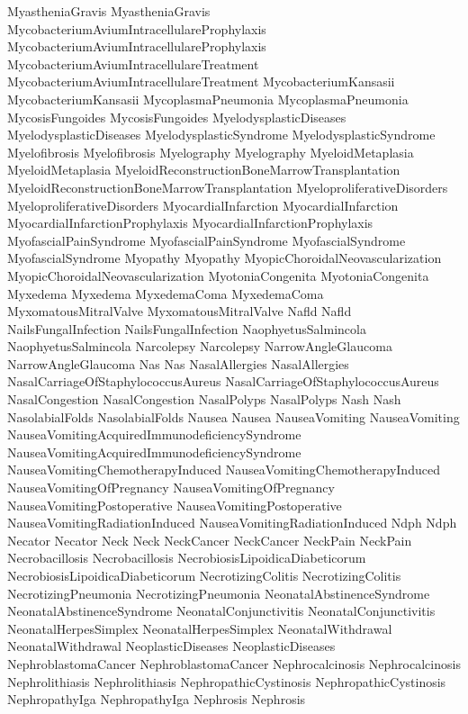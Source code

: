  MyastheniaGravis
 MyastheniaGravis
 MycobacteriumAviumIntracellulareProphylaxis
 MycobacteriumAviumIntracellulareProphylaxis
 MycobacteriumAviumIntracellulareTreatment
 MycobacteriumAviumIntracellulareTreatment
 MycobacteriumKansasii
 MycobacteriumKansasii
 MycoplasmaPneumonia
 MycoplasmaPneumonia
 MycosisFungoides
 MycosisFungoides
 MyelodysplasticDiseases
 MyelodysplasticDiseases
 MyelodysplasticSyndrome
 MyelodysplasticSyndrome
 Myelofibrosis
 Myelofibrosis
 Myelography
 Myelography
 MyeloidMetaplasia
 MyeloidMetaplasia
 MyeloidReconstructionBoneMarrowTransplantation
 MyeloidReconstructionBoneMarrowTransplantation
 MyeloproliferativeDisorders
 MyeloproliferativeDisorders
 MyocardialInfarction
 MyocardialInfarction
 MyocardialInfarctionProphylaxis
 MyocardialInfarctionProphylaxis
 MyofascialPainSyndrome
 MyofascialPainSyndrome
 MyofascialSyndrome
 MyofascialSyndrome
 Myopathy
 Myopathy
 MyopicChoroidalNeovascularization
 MyopicChoroidalNeovascularization
 MyotoniaCongenita
 MyotoniaCongenita
 Myxedema
 Myxedema
 MyxedemaComa
 MyxedemaComa
 MyxomatousMitralValve
 MyxomatousMitralValve
 Nafld
 Nafld
 NailsFungalInfection
 NailsFungalInfection
 NaophyetusSalmincola
 NaophyetusSalmincola
 Narcolepsy
 Narcolepsy
 NarrowAngleGlaucoma
 NarrowAngleGlaucoma
 Nas
 Nas
 NasalAllergies
 NasalAllergies
 NasalCarriageOfStaphylococcusAureus
 NasalCarriageOfStaphylococcusAureus
 NasalCongestion
 NasalCongestion
 NasalPolyps
 NasalPolyps
 Nash
 Nash
 NasolabialFolds
 NasolabialFolds
 Nausea
 Nausea
 NauseaVomiting
 NauseaVomiting
 NauseaVomitingAcquiredImmunodeficiencySyndrome
 NauseaVomitingAcquiredImmunodeficiencySyndrome
 NauseaVomitingChemotherapyInduced
 NauseaVomitingChemotherapyInduced
 NauseaVomitingOfPregnancy
 NauseaVomitingOfPregnancy
 NauseaVomitingPostoperative
 NauseaVomitingPostoperative
 NauseaVomitingRadiationInduced
 NauseaVomitingRadiationInduced
 Ndph
 Ndph
 Necator
 Necator
 Neck
 Neck
 NeckCancer
 NeckCancer
 NeckPain
 NeckPain
 Necrobacillosis
 Necrobacillosis
 NecrobiosisLipoidicaDiabeticorum
 NecrobiosisLipoidicaDiabeticorum
 NecrotizingColitis
 NecrotizingColitis
 NecrotizingPneumonia
 NecrotizingPneumonia
 NeonatalAbstinenceSyndrome
 NeonatalAbstinenceSyndrome
 NeonatalConjunctivitis
 NeonatalConjunctivitis
 NeonatalHerpesSimplex
 NeonatalHerpesSimplex
 NeonatalWithdrawal
 NeonatalWithdrawal
 NeoplasticDiseases
 NeoplasticDiseases
 NephroblastomaCancer
 NephroblastomaCancer
 Nephrocalcinosis
 Nephrocalcinosis
 Nephrolithiasis
 Nephrolithiasis
 NephropathicCystinosis
 NephropathicCystinosis
 NephropathyIga
 NephropathyIga
 Nephrosis
 Nephrosis
